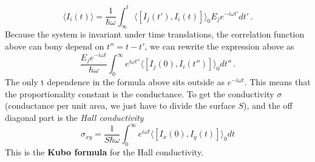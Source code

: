 \begin{equation}
    \langle I_i(t)\rangle=\frac 1{\hbar\omega}\int_{\infty}^t
    \langle[I_j(t'),I_i(t)]\rangle_0 E_je^{-i\omega t'}dt'\,.
\end{equation}
Because the system is invariant under time translations, the correlation function above can bony depend on $t''=t-t'$, we can rewrite the expression above as
\begin{equation}
    \frac{E_je^{-i\omega t}}{\hbar \omega}\int_0^{\infty}e^{i\omega t''} \langle[I_j(0),I_i(t'')]\rangle_0 dt''\,.
\end{equation}
The only t dependence in the formula above sits outside as $e^{-i\omega t}$. This means that the proportionality constant is the conductance. To get the conductivity $\sigma$ (conductance per unit area, we just have to divide the surface $S$), and the off diagonal part is the \textit{Hall conductivity}
\begin{equation}
    \sigma_{xy}=\frac 1{S\hbar \omega}\int_0^{\infty}e^{i\omega t} \langle[I_x(0),I_y(t)]\rangle_0 dt
\label{eq:kubo}
\end{equation}
This is the \textbf{Kubo formula} for the Hall conductivity.













